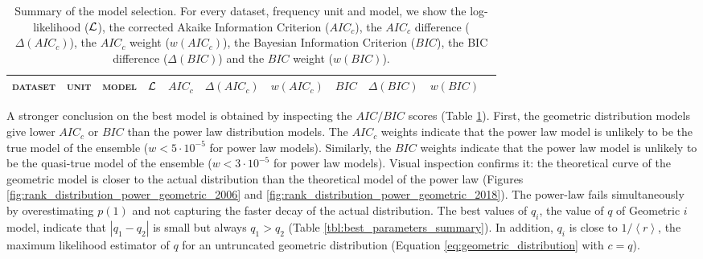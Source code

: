 \documentclass[USenglish]{article}
\newcommand{\loglikelihood}{{\cal L}}
\begin{document}
\begin{landscape} 
\begin{table}[h]
\begin{center}
\begin{tabular}{lllllllllll}
\textsc{dataset} & \textsc{unit} & \textsc{model} & ${\cal L}$ & $AIC_c$ & $\Delta(AIC_c)$ & $w(AIC_c)$ & $BIC$ & $\Delta(BIC)$ & $w(BIC)$\\
\toprule
 
\end{tabular}
\end{center}
\caption{\label{tbl:model_selection_summary}
Summary of the model selection. For every dataset, frequency unit and model, we show the log-likelihood ($\loglikelihood$), the corrected Akaike Information Criterion ($AIC_c$), the $AIC_c$ difference ($\Delta(AIC_c)$), the $AIC_c$ weight ($w(AIC_c)$), the Bayesian Information Criterion ($BIC$), the BIC difference ($\Delta(BIC)$) and the $BIC$ weight ($w(BIC)$). }
\end{table}
\end{landscape}

A stronger conclusion on the best model is obtained by inspecting the $AIC/BIC$ scores (Table \ref{tbl:model_selection_summary}). First, the geometric distribution models give lower $AIC_c$ or $BIC$ than the power law distribution models. The $AIC_c$ weights indicate that the power law model is unlikely to be the true model of the ensemble ($w < 5\cdot 10^{-5}$ for power law models).
Similarly, the $BIC$ weights indicate that the power law model is unlikely to be the quasi-true model of the ensemble ($w < 3\cdot 10^{-5}$ for power law models). Visual inspection confirms it: the theoretical curve of the geometric model is closer to the actual distribution than the theoretical model of the power law (Figures \ref{fig:rank_distribution_power_geometric_2006} and \ref{fig:rank_distribution_power_geometric_2018}). The power-law fails simultaneously by overestimating $p(1)$ and not capturing the faster decay of the actual distribution.
The best values of $q_i$, the value of $q$ of Geometric $i$ model, indicate that $|q_1 - q_2|$ is small but always $q_1 > q_2$ (Table \ref{tbl:best_parameters_summary}). 
In addition, $q_i$ is close to $1/\left< r \right>$, the maximum likelihood estimator of $q$ for an untruncated geometric distribution (Equation \ref{eq:geometric_distribution} with $c = q$).
\end{document}
